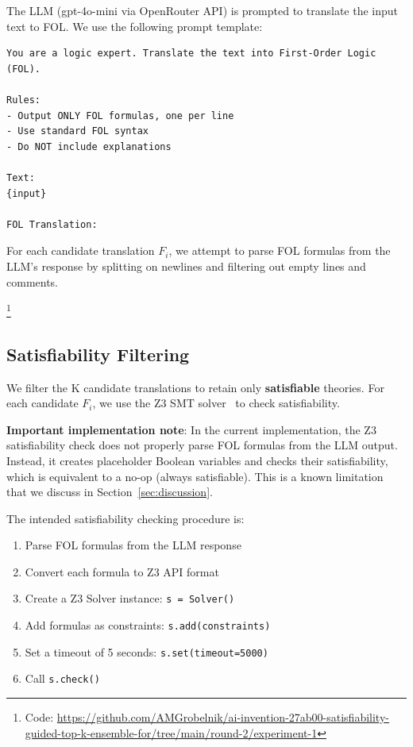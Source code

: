 \documentclass[11pt,letterpaper]{article}
\begin{document}
The LLM (gpt-4o-mini via OpenRouter API) is prompted to translate the input text to FOL. We use the following prompt template:

\begin{verbatim}
You are a logic expert. Translate the text into First-Order Logic (FOL).

Rules:
- Output ONLY FOL formulas, one per line
- Use standard FOL syntax
- Do NOT include explanations

Text:
{input}

FOL Translation:
\end{verbatim}

For each candidate translation $F_i$, we attempt to parse FOL formulas from the LLM's response by splitting on newlines and filtering out empty lines and comments.

\footnote{Code: \url{https://github.com/AMGrobelnik/ai-invention-27ab00-satisfiability-guided-top-k-ensemble-for/tree/main/round-2/experiment-1}}

\subsection{Satisfiability Filtering}

We filter the K candidate translations to retain only \textbf{satisfiable} theories. For each candidate $F_i$, we use the Z3 SMT solver~\cite{DeMoura2008} to check satisfiability.

\textbf{Important implementation note}: In the current implementation, the Z3 satisfiability check does not properly parse FOL formulas from the LLM output. Instead, it creates placeholder Boolean variables and checks their satisfiability, which is equivalent to a no-op (always satisfiable). This is a known limitation that we discuss in Section~\ref{sec:discussion}.

The intended satisfiability checking procedure is:
\begin{enumerate}
    \item Parse FOL formulas from the LLM response
    \item Convert each formula to Z3 API format
    \item Create a Z3 Solver instance: \texttt{s = Solver()}
    \item Add formulas as constraints: \texttt{s.add(constraints)}
    \item Set a timeout of 5 seconds: \texttt{s.set(timeout=5000)}
    \item Call \texttt{s.check()}
\end{enumerate}
\end{document}
